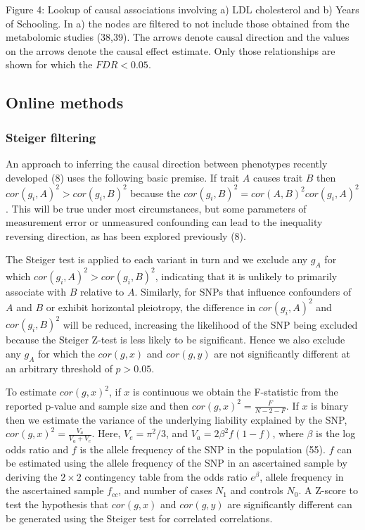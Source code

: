 \documentclass[]{article}
\begin{document}
Figure 4: Lookup of causal associations involving a) LDL cholesterol and
b) Years of Schooling. In a) the nodes are filtered to not include those
obtained from the metabolomic studies (38,39). The arrows denote causal
direction and the values on the arrows denote the causal effect
estimate. Only those relationships are shown for which the
\(FDR < 0.05\).

\newpage

\subsection{Online methods}\label{online-methods}

\subsubsection{Steiger filtering}\label{steiger-filtering-1}

An approach to inferring the causal direction between phenotypes
recently developed (8) uses the following basic premise. If trait \(A\)
causes trait \(B\) then \(cor(g_{i}, A)^2 > cor(g_{i}, B)^2\) because
the \(cor(g_{i}, B)^2 = cor(A, B)^{2} cor(g_{i}, A)^{2}\). This will be
true under most circumstances, but some parameters of measurement error
or unmeasured confounding can lead to the inequality reversing
direction, as has been explored previously (8).

The Steiger test is applied to each variant in turn and we exclude any
\(g_{A}\) for which \(cor(g_{i}, A)^2 > cor(g_{i}, B)^2\), indicating
that it is unlikely to primarily associate with \(B\) relative to \(A\).
Similarly, for SNPs that influence confounders of \(A\) and \(B\) or
exhibit horizontal pleiotropy, the difference in \(cor(g_{i}, A)^2\) and
\(cor(g_{i}, B)^2\) will be reduced, increasing the likelihood of the
SNP being excluded because the Steiger Z-test is less likely to be
significant. Hence we also exclude any \(g_{A}\) for which the
\(cor(g, x)\) and \(cor(g, y)\) are not significantly different at an
arbitrary threshold of \(p > 0.05\).

To estimate \(cor(g, x)^2\), if \(x\) is continuous we obtain the
F-statistic from the reported p-value and sample size and then
\(cor(g, x)^2 = \frac{F}{N - 2 - F}\). If \(x\) is binary then we
estimate the variance of the underlying liability explained by the SNP,
\(cor(g, x)^2 = \frac{V_a}{V_a + V_e}\). Here, \(V_e = \pi^2/3\), and
\(V_a = 2\beta^2f(1-f)\), where \(\beta\) is the log odds ratio and
\(f\) is the allele frequency of the SNP in the population (55). \(f\)
can be estimated using the allele frequency of the SNP in an ascertained
sample by deriving the \(2 \times 2\) contingency table from the odds
ratio \(e^\beta\), allele frequency in the ascertained sample
\(f_{cc}\), and number of cases \(N_1\) and controls \(N_0\). A Z-score
to test the hypothesis that \(cor(g, x)\) and \(cor(g, y)\) are
significantly different can be generated using the Steiger test for
correlated correlations.
\end{document}
